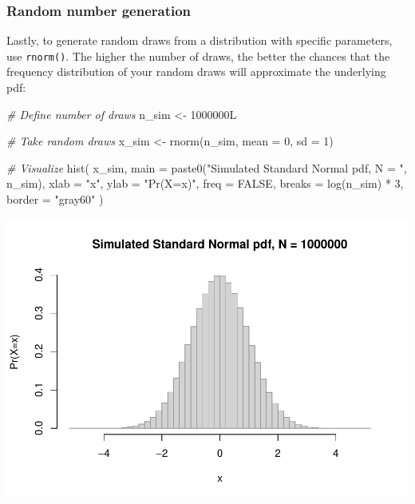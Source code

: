 \documentclass[
  11pt,
]{article}
\newenvironment{Shaded}{\begin{snugshade}}{\end{snugshade}}
\newcommand{\AttributeTok}[1]{\textcolor[rgb]{0.77,0.63,0.00}{#1}}
\newcommand{\CommentTok}[1]{\textcolor[rgb]{0.56,0.35,0.01}{\textit{#1}}}
\newcommand{\ConstantTok}[1]{\textcolor[rgb]{0.00,0.00,0.00}{#1}}
\newcommand{\DecValTok}[1]{\textcolor[rgb]{0.00,0.00,0.81}{#1}}
\newcommand{\FunctionTok}[1]{\textcolor[rgb]{0.00,0.00,0.00}{#1}}
\newcommand{\NormalTok}[1]{#1}
\newcommand{\OtherTok}[1]{\textcolor[rgb]{0.56,0.35,0.01}{#1}}
\newcommand{\SpecialCharTok}[1]{\textcolor[rgb]{0.00,0.00,0.00}{#1}}
\newcommand{\StringTok}[1]{\textcolor[rgb]{0.31,0.60,0.02}{#1}}
\begin{document}
\hypertarget{random-number-generation}{%
\subsubsection{Random number generation}\label{random-number-generation}}

Lastly, to generate random draws from a distribution with specific parameters, use \texttt{rnorm()}. The higher the number of draws, the better the chances that the frequency distribution of your random draws will approximate the underlying pdf:

\begin{Shaded}
\begin{Highlighting}[]
\CommentTok{\# Define number of draws}
\NormalTok{n\_sim }\OtherTok{\textless{}{-}}\NormalTok{ 1000000L}

\CommentTok{\# Take random draws}
\NormalTok{x\_sim }\OtherTok{\textless{}{-}} \FunctionTok{rnorm}\NormalTok{(n\_sim, }\AttributeTok{mean =} \DecValTok{0}\NormalTok{, }\AttributeTok{sd =} \DecValTok{1}\NormalTok{)}

\CommentTok{\# Visualize}
\FunctionTok{hist}\NormalTok{(}
\NormalTok{  x\_sim,}
  \AttributeTok{main =} \FunctionTok{paste0}\NormalTok{(}\StringTok{"Simulated Standard Normal pdf, N = "}\NormalTok{, n\_sim),}
  \AttributeTok{xlab =} \StringTok{"x"}\NormalTok{,}
  \AttributeTok{ylab =} \StringTok{"Pr(X=x)"}\NormalTok{,}
  \AttributeTok{freq =} \ConstantTok{FALSE}\NormalTok{,}
  \AttributeTok{breaks =} \FunctionTok{log}\NormalTok{(n\_sim) }\SpecialCharTok{*} \DecValTok{3}\NormalTok{,}
  \AttributeTok{border =} \StringTok{"gray60"}
\NormalTok{)}
\end{Highlighting}
\end{Shaded}

\includegraphics{01-lec-short_files/figure-latex/stdnorm-8-1.pdf}
\end{document}
